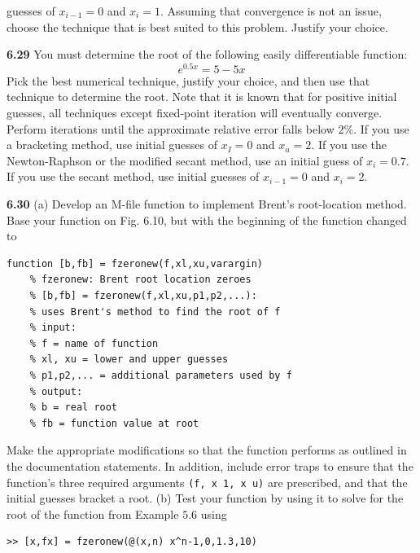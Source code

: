 \documentclass[../main.tex]{subfiles}
\begin{document}
\begin{multicols}{2}
    guesses of $x_{i-1}=0$ and $x_{i}=1$. Assuming that convergence is not an issue, choose the technique that is best suited to this problem. Justify your choice.
    
    \noindent\textbf{6.29} You must determine the root of the following easily differentiable function:
    $$
    e^{0.5 x}=5-5 x
    $$
    Pick the best numerical technique, justify your choice, and then use that technique to determine the root. Note that it is known that for positive initial guesses, all techniques except fixed-point iteration will eventually converge. Perform iterations until the approximate relative error falls below $2 \%$. If you use a bracketing method, use initial guesses of $x_{I}=0$ and $x_{u}=2$. If you use the Newton-Raphson or the modified secant method, use an initial guess of $x_{i}=0.7$. If you use the secant method, use initial guesses of $x_{i-1}=0$ and $x_{i}=2$.
   
    \noindent\textbf{6.30} (a) Develop an M-file function to implement Brent's root-location method. Base your function on Fig. 6.10, but with the beginning of the function changed to
    \begin{lstlisting}[numbers=none,frame=none,xleftmargin=-\leftmargini]
    function [b,fb] = fzeronew(f,xl,xu,varargin)
    % fzeronew: Brent root location zeroes
    % [b,fb] = fzeronew(f,xl,xu,p1,p2,...):
    % uses Brent's method to find the root of f
    % input:
    % f = name of function
    % xl, xu = lower and upper guesses
    % p1,p2,... = additional parameters used by f
    % output:
    % b = real root
    % fb = function value at root
    \end{lstlisting}
    
    Make the appropriate modifications so that the function performs as outlined in the documentation statements. In addition, include error traps to ensure that the function's three required arguments \texttt{(f, x 1, x u)} are prescribed, and that the initial guesses bracket a root.
    (b) Test your function by using it to solve for the root of the function from Example $5.6$ using
    
    \begin{lstlisting}[numbers=none,frame=none,xleftmargin=-\leftmargini]
    >> [x,fx] = fzeronew(@(x,n) x^n-1,0,1.3,10)
    \end{lstlisting}

\end{multicols}
\end{document}
